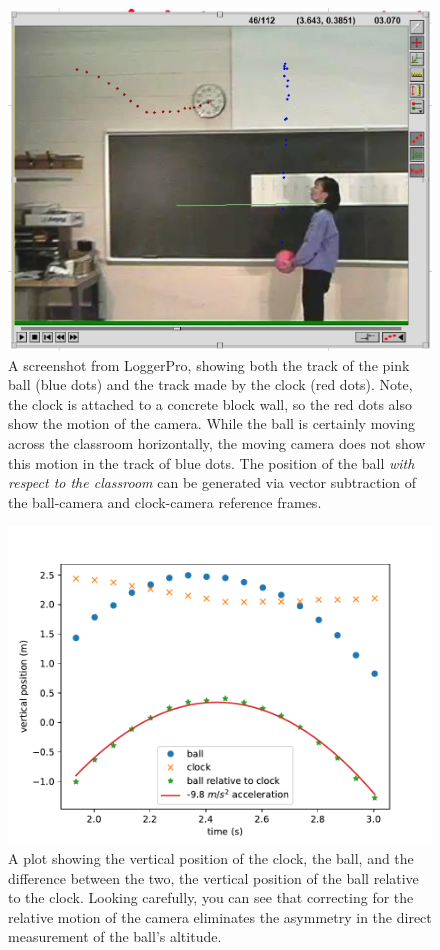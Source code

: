 \documentclass[12pt]{iopart}
\begin{document}
\begin{figure}[h]
\centering
\includegraphics[width=\columnwidth]{figure_3_Etkina-dots-2.jpg}
\caption{
A screenshot from LoggerPro, showing both the track of the pink ball (blue dots) and the track made by the clock (red dots).  Note, the clock is attached to a concrete block wall, so the red dots also show the motion of the camera.  
While the ball is certainly moving across the classroom horizontally, the moving camera does not show this motion in the track of blue dots.
The position of the ball \textit{with respect to the classroom} can be generated via vector subtraction of the ball-camera and clock-camera reference frames.
}
\label{Etkina-dots-2}
\end{figure}

\begin{figure}[h]
\centering
\includegraphics[width=\columnwidth]{figure_4_Etkina-Y-T-plot.pdf}
\caption{
A plot showing the vertical position of the clock, the ball, and the difference between the two, the vertical position of the ball relative to the clock. 
Looking carefully, you can see that correcting for the relative motion of the camera eliminates the asymmetry in the direct measurement of the ball's altitude.  
}
\label{Etkina-Y-T-plot}
\end{figure}
\end{document}
